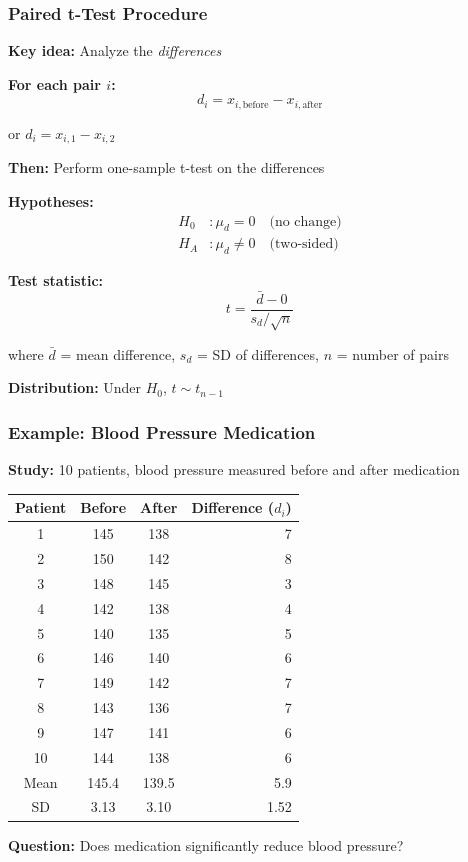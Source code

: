 \documentclass{beamer}
\begin{document}
\begin{frame}
\frametitle{Paired t-Test Procedure}
\textbf{Key idea:} Analyze the \textit{differences}

\vspace{0.2cm}
\textbf{For each pair $i$:}
$$d_i = x_{i,\text{before}} - x_{i,\text{after}}$$

or $d_i = x_{i,1} - x_{i,2}$

\vspace{0.2cm}
\textbf{Then:} Perform one-sample t-test on the differences

\vspace{0.2cm}
\textbf{Hypotheses:}
\begin{align*}
H_0&: \mu_d = 0 \quad \text{(no change)}\\
H_A&: \mu_d \neq 0 \quad \text{(two-sided)}
\end{align*}

\vspace{0.2cm}
\textbf{Test statistic:}
$$t = \frac{\bar{d} - 0}{s_d / \sqrt{n}}$$

where $\bar{d}$ = mean difference, $s_d$ = SD of differences, $n$ = number of pairs

\vspace{0.1cm}
\textbf{Distribution:} Under $H_0$, $t \sim t_{n-1}$
\end{frame}

\begin{frame}
\frametitle{Example: Blood Pressure Medication}
\textbf{Study:} 10 patients, blood pressure measured before and after medication

\vspace{0.3cm}
\begin{center}
\small
\begin{tabular}{cccr}
\toprule
Patient & Before & After & Difference ($d_i$) \\
\midrule
1 & 145 & 138 & 7 \\
2 & 150 & 142 & 8 \\
3 & 148 & 145 & 3 \\
4 & 142 & 138 & 4 \\
5 & 140 & 135 & 5 \\
6 & 146 & 140 & 6 \\
7 & 149 & 142 & 7 \\
8 & 143 & 136 & 7 \\
9 & 147 & 141 & 6 \\
10 & 144 & 138 & 6 \\
\midrule
Mean & 145.4 & 139.5 & 5.9 \\
SD & 3.13 & 3.10 & 1.52 \\
\bottomrule
\end{tabular}
\end{center}

\vspace{0.3cm}
\textbf{Question:} Does medication significantly reduce blood pressure?
\end{frame}
\end{document}
